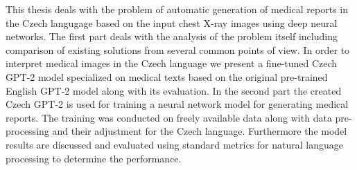 \documentclass[12pt]{report}
\begin{document}

This thesis deals with the problem of automatic generation of medical reports in the Czech langugage based on the input chest X-ray images using deep neural networks. The first part deals with the analysis of the problem itself including comparison of existing solutions from several common points of view. In order to interpret medical images in the Czech language we present a fine-tuned Czech GPT-2 model specialized on medical texts based on the original pre-trained English GPT-2 model along with its evaluation. In the second part the created Czech GPT-2 is used for training a neural network model for generating medical reports. The training was conducted on freely available data along with data pre-processing and their adjustment for the Czech language. Furthermore the model results are discussed and evaluated using standard metrics for natural language processing to determine the performance.
\end{document}
